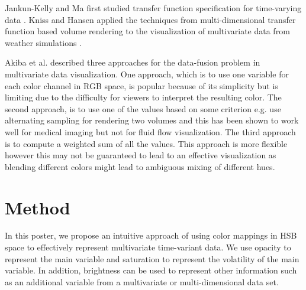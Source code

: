 Jankun-Kelly and Ma first studied  transfer function specification for time-varying data \cite{jankun-kelly_study_2001}.
Kniss and Hansen applied the techniques from multi-dimensional transfer function based volume rendering to the visualization of multivariate data from weather simulations \cite{kniss_volume_2002}.



Akiba et al. \cite{akiba_visualizing_2007} described three approaches for the data-fusion problem in multivariate data visualization.
One approach, which is to use one variable for each color channel in RGB space, is popular because of its simplicity but is limiting due to the difficulty for viewers to interpret the resulting color.
The second approach, is to use one of the values based on some criterion e.g. \cite{hastreiter_integrated_1998}
use alternating sampling for rendering two volumes and this has been shown to work well for medical imaging but not for fluid flow visualization.
The third approach is to compute a weighted sum of all the values. This approach is more flexible however this may not be guaranteed to lead to an effective visualization as blending different colors might lead to ambiguous mixing of different hues.



\section{Method}
In this poster, we propose an intuitive approach of using color mappings in HSB space to effectively represent multivariate time-variant data. We use opacity to represent the main variable and saturation to represent the volatility of the main variable. In addition, brightness can be used to represent other information such as an additional variable from a multivariate or multi-dimensional data set. 

